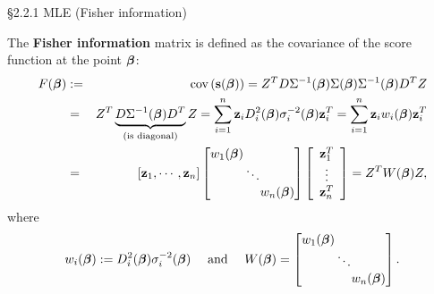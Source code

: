 \documentclass{beamer}
\begin{document}
\begin{frame}{\S2.2.1 MLE (Fisher information)}

The \textbf{Fisher information} matrix is defined as the covariance of the score function at the point $\mbox{\boldmath $\beta$}$: 
\begin{eqnarray*}
F(\mbox{\boldmath $\beta$})&:=& \mbox{cov}\left(\textbf{s}(\mbox{\boldmath $\beta$})\right)= Z^T D \Sigma^{-1}({\boldsymbol \beta}) \Sigma({\boldsymbol \beta})  \Sigma^{-1}({\boldsymbol \beta}) D^T Z  \\
&= &
 Z^T \underbrace{D\Sigma^{-1}({\boldsymbol \beta}) D^T }_{\text{(is diagonal)}}Z = \sum_{i=1}^n \textbf{z}_i D_i^2(\mbox{\boldmath $\beta$})\sigma_i^{-2}(\mbox{\boldmath $\beta$}) 
\textbf{z}_i^T=\sum_{i=1}^n \textbf{z}_i w_i(\mbox{\boldmath $\beta$})\textbf{z}_i^T \\
&=& \left[\textbf{z}_1, \cdots, \textbf{z}_n\right]  \left[\begin{array}{ccc}
\!\!\!w_1(\mbox{\boldmath $\beta$})\!\! & & \\
& \!\!\!\ddots\!\!\! & \\ & & \!\!\!w_n(\mbox{\boldmath $\beta$})\!\!\!\end{array}\right] 
\left[\begin{array}{c} \textbf{z}_1^T \\ \vdots \\ \textbf{z}_n^T\end{array}\right]
=Z^TW(\mbox{\boldmath $\beta$})Z,
\end{eqnarray*}
 where 
 \[
 w_i(\mbox{\boldmath $\beta$}):=D_i^2(\mbox{\boldmath $\beta$})\sigma_i^{-2}(\mbox{\boldmath $\beta$}) \quad \text{ and } \quad 
 W(\mbox{\boldmath $\beta$})=\left[\begin{array}{ccc}
\!\!\!w_1(\mbox{\boldmath $\beta$})\!\! & & \\
& \!\!\!\ddots\!\!\! & \\ & & \!\!\!w_n(\mbox{\boldmath $\beta$})\!\!\!\end{array}\right].
 \]
%

\end{frame}
\end{document}
